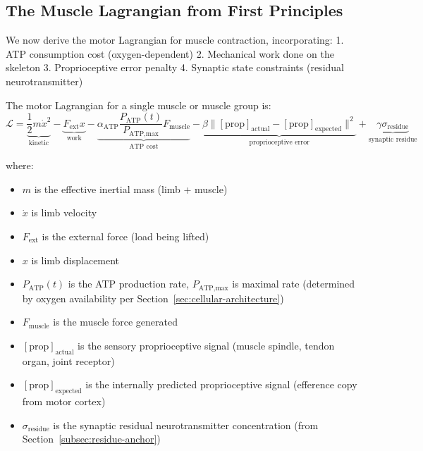 \subsection{The Muscle Lagrangian from First Principles}
\label{subsec:muscle-lagrangian}

We now derive the motor Lagrangian for muscle contraction, incorporating:
1. ATP consumption cost (oxygen-dependent)
2. Mechanical work done on the skeleton
3. Proprioceptive error penalty
4. Synaptic state constraints (residual neurotransmitter)

\begin{definition}
\label{def:muscle-lagrangian}
The motor Lagrangian for a single muscle or muscle group is:
\begin{equation}
\boxed{
\mathcal{L} = \underbrace{\frac{1}{2}m\dot{x}^2}_{\text{kinetic}} - \underbrace{F_{\text{ext}} x}_{\text{work}} - \underbrace{\alpha_{\text{ATP}} \frac{P_{\text{ATP}}(t)}{P_{\text{ATP,max}}} F_{\text{muscle}}}_{\text{ATP cost}} - \underbrace{\beta \|[\text{prop}]_{\text{actual}} - [\text{prop}]_{\text{expected}}\|^2}_{\text{proprioceptive error}} + \underbrace{\gamma \sigma_{\text{residue}}}_{\text{synaptic residue}}
}
\label{eq:muscle-lagrangian}
\end{equation}

where:
\begin{itemize}[noitemsep]
\item $m$ is the effective inertial mass (limb + muscle)
\item $\dot{x}$ is limb velocity
\item $F_{\text{ext}}$ is the external force (load being lifted)
\item $x$ is limb displacement
\item $P_{\text{ATP}}(t)$ is the ATP production rate, $P_{\text{ATP,max}}$ is maximal rate (determined by oxygen availability per Section~\ref{sec:cellular-architecture})
\item $F_{\text{muscle}}$ is the muscle force generated
\item $[\text{prop}]_{\text{actual}}$ is the sensory proprioceptive signal (muscle spindle, tendon organ, joint receptor)
\item $[\text{prop}]_{\text{expected}}$ is the internally predicted proprioceptive signal (efference copy from motor cortex)
\item $\sigma_{\text{residue}}$ is the synaptic residual neurotransmitter concentration (from Section~\ref{subsec:residue-anchor})
\end{itemize}
\end{definition}

